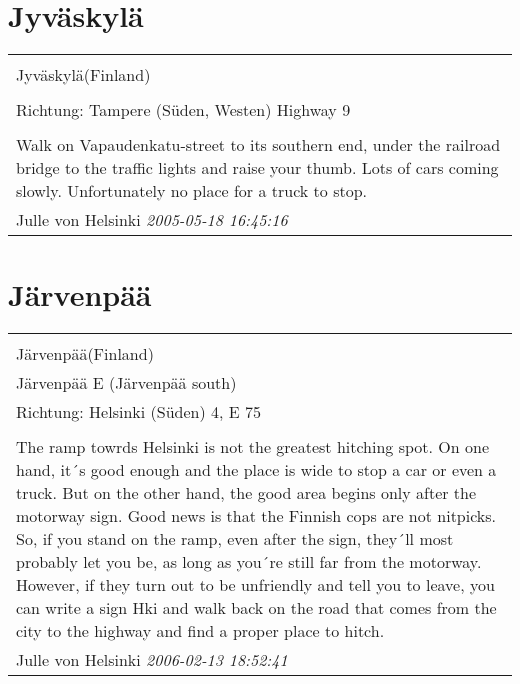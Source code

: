 \documentclass[a4paper,12pt]{article}
\begin{document}
\section{Jyväskylä}
\begin{tabular}{|p{13cm}|}
\hline\\
Jyväskylä(Finland)\\
\\
Richtung: Tampere (Süden, Westen) Highway 9 \\
\hline\\
Walk on Vapaudenkatu-street to its southern end, under the railroad bridge to the traffic lights and raise your thumb. Lots of cars coming slowly. Unfortunately no place for a truck to stop. \\
Julle von Helsinki \textit{ 2005-05-18 16:45:16 }\\\hline
\end{tabular}


\section{Järvenpää}
\begin{tabular}{|p{13cm}|}
\hline\\
Järvenpää(Finland)\\
Järvenpää E (Järvenpää south)\\
Richtung: Helsinki (Süden) 4, E 75 \\
\hline\\
The ramp towrds Helsinki is not the greatest hitching spot. On one hand, it´s good enough and the place is wide to stop a car or even a truck. But on the other hand, the good area begins only after the motorway sign. Good news is that the Finnish cops are not nitpicks. So, if you stand on the ramp, even after the sign, they´ll most probably let you be, as long as you´re still far from the motorway. However, if they turn out to be unfriendly and tell you to leave, you can write a sign Hki and walk back on the road that comes from the city to the highway and find a proper place to hitch. \\
Julle von Helsinki \textit{ 2006-02-13 18:52:41 }\\\hline
\end{tabular}
\end{document}
